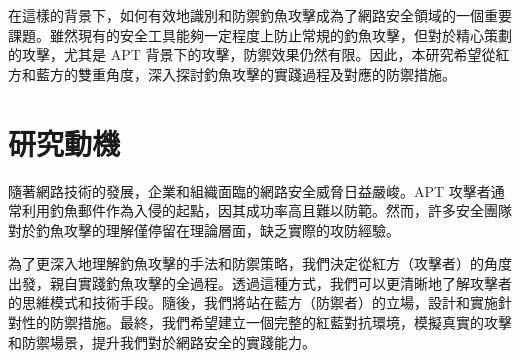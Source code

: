 \documentclass[a4paper,12pt]{article}
\begin{document}
在這樣的背景下，如何有效地識別和防禦釣魚攻擊成為了網路安全領域的一個重要課題。雖然現有的安全工具能夠一定程度上防止常規的釣魚攻擊，但對於精心策劃的攻擊，尤其是 APT 背景下的攻擊，防禦效果仍然有限。因此，本研究希望從紅方和藍方的雙重角度，深入探討釣魚攻擊的實踐過程及對應的防禦措施。

\section{研究動機}
隨著網路技術的發展，企業和組織面臨的網路安全威脅日益嚴峻。APT 攻擊者通常利用釣魚郵件作為入侵的起點，因其成功率高且難以防範。然而，許多安全團隊對於釣魚攻擊的理解僅停留在理論層面，缺乏實際的攻防經驗。

為了更深入地理解釣魚攻擊的手法和防禦策略，我們決定從紅方（攻擊者）的角度出發，親自實踐釣魚攻擊的全過程。透過這種方式，我們可以更清晰地了解攻擊者的思維模式和技術手段。隨後，我們將站在藍方（防禦者）的立場，設計和實施針對性的防禦措施。最終，我們希望建立一個完整的紅藍對抗環境，模擬真實的攻擊和防禦場景，提升我們對於網路安全的實踐能力。

\end{document}
